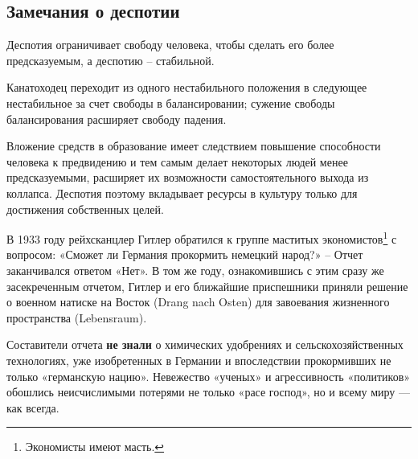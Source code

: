 \subsection[Замечания о деспотии]{Замечания о деспотии}

Деспотия ограничивает свободу человека, чтобы сделать его более предсказуемым, а деспотию – стабильной.

Канатоходец переходит из одного нестабильного положения в следующее нестабильное за счет свободы в балансировании;
сужение свободы балансирования расширяет свободу падения.


Вложение средств в образование имеет следствием повышение способности человека к предвидению и тем самым делает
некоторых людей менее предсказуемыми, расширяет их возможности самостоятельного выхода из коллапса. Деспотия поэтому
вкладывает ресурсы в культуру только для достижения собственных целей.

В 1933 году рейхсканцлер Гитлер обратился к группе маститых
экономистов\footnote{Экономисты имеют масть.} с вопросом: «Сможет ли
Германия прокормить немецкий народ?» – Отчет заканчивался ответом «Нет». В том же году, ознакомившись с этим сразу же
засекреченным отчетом, Гитлер и его ближайшие приспешники приняли решение о военном натиске на Восток
(Drang nach Osten) для завоевания жизненного пространства (Lebensraum).

Составители отчета \textbf{не знали} о
химических удобрениях и сельскохозяйственных технологиях, уже изобретенных в Германии и впоследствии прокормивших не
только «германскую нацию». Невежество «ученых» и агрессивность «политиков» обошлись неисчислимыми потерями не только
«расе господ», но и всему миру — как всегда.
%

